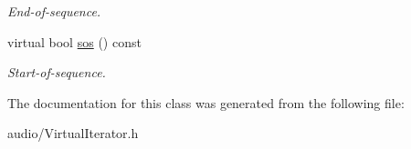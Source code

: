 \begin{DoxyCompactItemize}
\begin{DoxyCompactList}\small\item\em End-\/of-\/sequence. \end{DoxyCompactList}\item 
virtual bool \hyperlink{classAudio_1_1ChainingIterator_aaab79153b46e2a5696918866a0a2da93}{sos} () const \hypertarget{classAudio_1_1ChainingIterator_aaab79153b46e2a5696918866a0a2da93}{}\label{classAudio_1_1ChainingIterator_aaab79153b46e2a5696918866a0a2da93}

\begin{DoxyCompactList}\small\item\em Start-\/of-\/sequence. \end{DoxyCompactList}\end{DoxyCompactItemize}


The documentation for this class was generated from the following file\+:\begin{DoxyCompactItemize}
\item 
audio/Virtual\+Iterator.\+h\end{DoxyCompactItemize}
